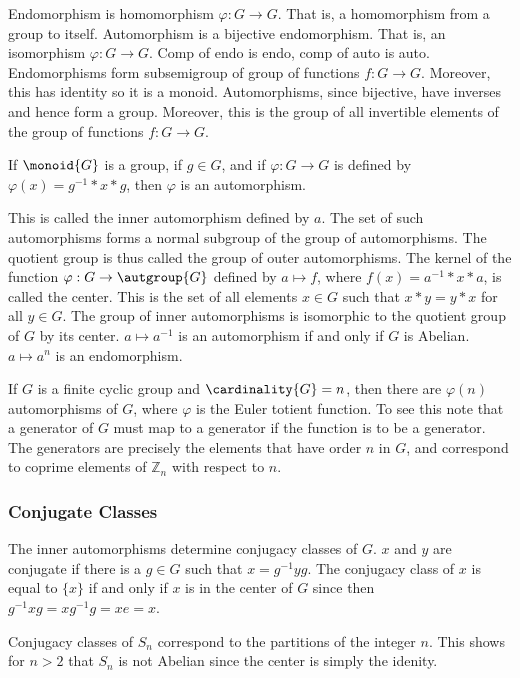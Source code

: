             Endomorphism is homomorphism $\varphi:G\rightarrow{G}$. That is,
            a homomorphism from a group to itself. Automorphism is a
            bijective endomorphism. That is, an isomorphism
            $\varphi:G\rightarrow{G}$. Comp of endo is endo, comp of auto is
            auto. Endomorphisms form subsemigroup of group of functions
            $f:G\rightarrow{G}$. Moreover, this has identity so it is a
            monoid. Automorphisms, since bijective, have inverses and hence
            form a group. Moreover, this is the group of all invertible
            elements of the group of functions $f:G\rightarrow{G}$.
            \begin{theorem}
                If $\monoid{G}$ is a group, if $g\in{G}$, and if
                $\varphi:G\rightarrow{G}$ is defined by
                $\varphi(x)=g^{\minus{1}}*x*g$, then $\varphi$ is an
                automorphism.
            \end{theorem}
            This is called the inner automorphism defined by $a$. The set
            of such automorphisms forms a normal subgroup of the group of
            automorphisms. The quotient group is thus called the group of
            outer automorphisms. The kernel of the function
            $\varphi:G\rightarrow\autgroup{G}$ defined by
            $a\mapsto{f}$, where $f(x)=a^{\minus{1}}*x*a$, is called the
            center. This is the set of all elements $x\in{G}$ such that
            $x*y=y*x$ for all $y\in{G}$. The group of inner automorphisms is
            isomorphic to the quotient group of $G$ by its center.
            $a\mapsto{a}^{\minus{1}}$ is an automorphism if and only if
            $G$ is Abelian. $a\mapsto{a}^{n}$ is an endomorphism.
            \begin{example}
                If $G$ is a finite cyclic group and $\cardinality{G}=n$,
                then there are $\varphi(n)$ automorphisms of $G$, where
                $\varphi$ is the Euler totient function. To see this note
                that a generator of $G$ must map to a generator if the
                function is to be a generator. The generators are precisely
                the elements that have order $n$ in $G$, and correspond to
                coprime elements of $\mathbb{Z}_{n}$ with respect to $n$.
            \end{example}
        \subsubsection{Conjugate Classes}
            The inner automorphisms determine conjugacy classes of $G$.
            $x$ and $y$ are conjugate if there is a $g\in{G}$ such that
            $x=g^{\minus{1}}yg$. The conjugacy class of $x$ is equal to
            $\{x\}$ if and only if $x$ is in the center of $G$ since then
            $g^{\minus{1}}xg=xg^{\minus{1}}g=xe=x$.
            \begin{example}
                Conjugacy classes of $S_{n}$ correspond to the partitions of
                the integer $n$. This shows for $n>2$ that $S_{n}$ is not
                Abelian since the center is simply the idenity.
            \end{example}
